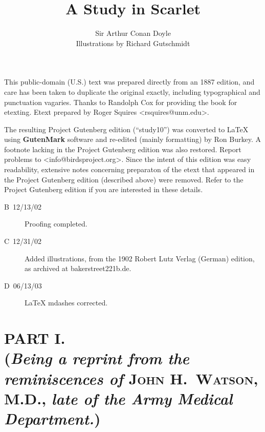 \documentclass[12pt,english,oneside]{book}
\newcommand{\noun}[1]{\textsc{#1}}
\begin{document}
\pagestyle{empty}



\date{}

\raggedbottom


\title{A Study in Scarlet}


\author{Sir Arthur Conan Doyle\\
{\normalsize Illustrations by Richard Gutschmidt}}

\maketitle
{}

\noindent This public-domain (U.S.) text was prepared directly from
an 1887 edition, and care has been taken to duplicate the original
exactly, including typographical and punctuation vagaries. Thanks
to Randolph Cox for providing the book for etexting. Etext prepared
by Roger Squires <rsquires@unm.edu>.

\bigskip{}
\noindent The resulting Project Gutenberg edition ({}``study10'')
was converted to \LaTeX{} using \textbf{GutenMark} software and re-edited
(mainly formatting) by Ron Burkey. A footnote lacking in the Project
Gutenberg edition was also restored. Report problems to <info@birdsproject.org>.
Since the intent of this edition was easy readability, extensive notes
concerning preparaton of the etext that appeared in the Project Gutenberg
edition (described above) were removed. Refer to the Project Gutenberg
edition if you are interested in these details.

\begin{description}
\item [B~12/13/02]Proofing completed.
\item [C~12/31/02]Added illustrations, from the 1902 Robert Lutz Verlag
(German) edition, as archived at bakerstreet221b.de.
\item [D~06/13/03]\LaTeX{} mdashes corrected.
\end{description}

\frontmatter

\pagestyle{myheadings} {\footnotesize \tableofcontents{}}\newpage


\mainmatter



\part*{PART I.\protect \\
{\normalsize (}\textit{\normalsize Being a reprint from the reminiscences
of} \noun{\normalsize John H.\ Watson, M.D.}{\normalsize ,} \textit{\normalsize late
of the Army Medical Department.}{\normalsize )}}
\end{document}
